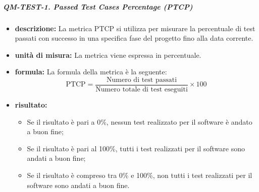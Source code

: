             \subparagraph{QM-TEST-1. Passed Test Cases Percentage (PTCP)}
            \begin{itemize}
                \item \textbf{descrizione: }
                La metrica PTCP si utilizza per misurare la percentuale di test passati con successo in una specifica fase del progetto fino alla data corrente.

                \item \textbf{unità di misura: }
                La metrica viene espressa in percentuale.

                \item \textbf{formula: }
                La formula della metrica è la seguente:
                \[
                    \text{PTCP} = \frac{\text{Numero di test passati}}{\text{Numero totale di test eseguiti}} \times 100
                \]

                \item \textbf{risultato: }
                \begin{itemize}
                    \item Se il risultato è pari a 0\%, nessun test realizzato per il software è andato a buon fine;
                    \item Se il risultato è pari al 100\%, tutti i test realizzati per il software sono andati a buon fine;
                    \item Se il risultato è compreso tra 0\% e 100\%, non tutti i test realizzati per il software sono andati a buon fine.
                \end{itemize}
            \end{itemize}

